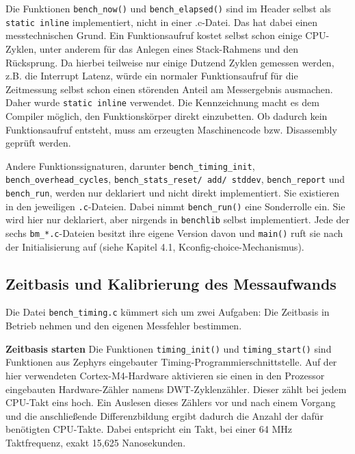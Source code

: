 Die Funktionen \lstinline[style=fileinline]|bench_now()| und \lstinline[style=fileinline]|bench_elapsed()| sind im Header selbst als \lstinline[style=fileinline]|static inline| implementiert, nicht in einer .c-Datei. Das hat dabei einen messtechnischen Grund. Ein Funktionsaufruf kostet selbst schon einige CPU-Zyklen, unter anderem für das Anlegen eines Stack-Rahmens und den Rücksprung. Da hierbei teilweise nur einige Dutzend Zyklen gemessen werden, z.B. die Interrupt Latenz, würde ein normaler Funktionsaufruf für die Zeitmessung selbst schon einen störenden Anteil am Messergebnis ausmachen. Daher wurde \lstinline[style=fileinline]|static inline| verwendet. Die Kennzeichnung macht es dem Compiler möglich, den Funktionskörper direkt einzubetten. Ob dadurch kein Funktionsaufruf entsteht, muss am erzeugten Maschinencode bzw. Disassembly geprüft werden.

Andere Funktionssignaturen, darunter \lstinline[style=fileinline]|bench_timing_init|, \lstinline[style=fileinline]|bench_overhead_cycles|, \lstinline[style=fileinline]|bench_stats_reset/ add/ stddev|, \lstinline[style=fileinline]|bench_report| und \lstinline[style=fileinline]|bench_run|, werden nur deklariert und nicht direkt implementiert. Sie existieren in den jeweiligen \lstinline[style=fileinline]|.c|-Dateien. Dabei nimmt \lstinline[style=fileinline]|bench_run()| eine Sonderrolle ein. Sie wird hier nur deklariert, aber nirgends in \lstinline[style=fileinline]|benchlib| selbst implementiert. Jede der sechs \lstinline[style=fileinline]|bm_*.c|-Dateien besitzt ihre eigene Version davon und \lstinline[style=fileinline]|main()| ruft sie nach der Initialisierung auf (siehe Kapitel 4.1, Kconfig-choice-Mechanismus).

\subsection{Zeitbasis und Kalibrierung des Messaufwands}
Die Datei \lstinline[style=fileinline]|bench_timing.c| kümmert sich um zwei Aufgaben: Die Zeitbasis in Betrieb nehmen und den eigenen Messfehler bestimmen.

\textbf{Zeitbasis starten }Die Funktionen \lstinline[style=fileinline]|timing_init()| und \lstinline[style=fileinline]|timing_start()| sind Funktionen aus Zephyrs eingebauter Timing-Programmierschnittstelle. Auf der hier verwendeten Cortex-M4-Hardware aktivieren sie einen in den Prozessor eingebauten Hardware-Zähler namens DWT-Zyklenzähler. Dieser zählt bei jedem CPU-Takt eins hoch. Ein Auslesen dieses Zählers vor und nach einem Vorgang und die anschließende Differenzbildung ergibt dadurch die Anzahl der dafür benötigten CPU-Takte. Dabei entspricht ein Takt, bei einer 64 MHz Taktfrequenz, exakt 15,625 Nanosekunden.

